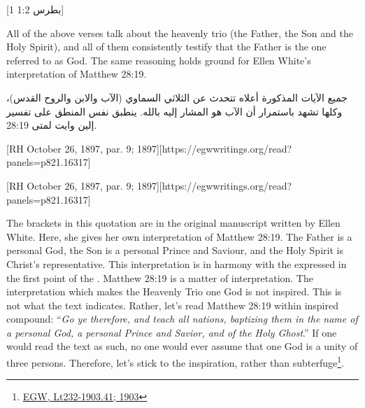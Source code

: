 [1 بطرس 1:2]


All of the above verses talk about the heavenly trio (the Father, the Son and the Holy Spirit), and all of them consistently testify that the Father is the one referred to as God.
The same reasoning holds ground for Ellen White’s interpretation of Matthew 28:19.


جميع الآيات المذكورة أعلاه تتحدث عن الثلاثي السماوي (الآب والابن والروح القدس)، وكلها تشهد باستمرار أن الآب هو المشار إليه بالله.
ينطبق نفس المنطق على تفسير إلين وايت لمتى 28:19.


[RH October 26, 1897, par. 9; 1897][https://egwwritings.org/read?panels=p821.16317]


[RH October 26, 1897, par. 9; 1897][https://egwwritings.org/read?panels=p821.16317]


The brackets in this quotation are in the original manuscript written by Ellen White. Here, she gives her own interpretation of Matthew 28:19. The Father is a personal God, the Son is a personal Prince and Saviour, and the Holy Spirit is Christ’s representative. This interpretation is in harmony with the  expressed in the first point of the . Matthew 28:19 is a matter of interpretation. The interpretation which makes the Heavenly Trio one God is not inspired. This is not what the text indicates. Rather, let's read Matthew 28:19 within inspired compound: “\textit{Go ye therefore, and teach all nations, baptizing them in the name of a personal God, a personal Prince and Savior, and of the Holy Ghost}.” If one would read the text as such, no one would ever assume that one God is a unity of three persons. Therefore, let's stick to the inspiration, rather than subterfuge\footnote{\href{https://egwwritings.org/?ref=en\_Lt232-1903.41&para=10197.50}{{EGW, Lt232-1903.41; 1903}}}.


